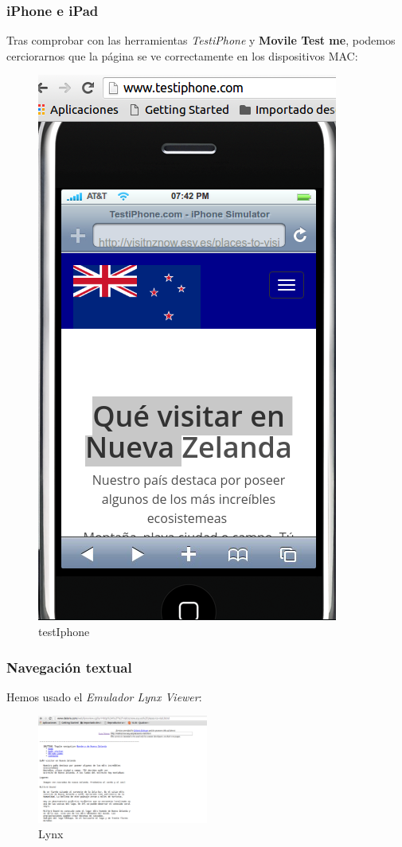 \subsubsection{iPhone e iPad}
Tras comprobar con las herramientas \textit{TestiPhone} y \textbf{Movile Test me}, podemos cerciorarnos que la página se ve correctamente en los dispositivos MAC:
\begin{figure}[h]
	\centering
	\includegraphics[height=0.50\textwidth]{./Fotos/testiphone.png}
	\caption{testIphone}
	\label{fig: testIphone}
\end{figure}


\subsubsection{Navegación textual}
Hemos usado el \textit{Emulador Lynx Viewer}:

\begin{figure}[h]
	\centering
	\includegraphics[width=0.50\textwidth]{./Fotos/lynx.png}
	\caption{Lynx}
	\label{fig: Resultados del Lynx}
\end{figure}


